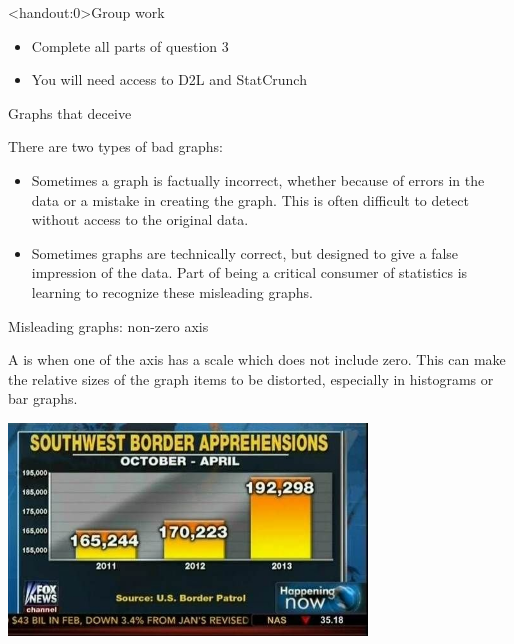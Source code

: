 \documentclass[]{beamer}
\begin{document}
\begin{frame}<handout:0>{Group work}
\begin{block}{}
\large
\begin{itemize}
\item Complete all parts of question 3
\item You will need access to D2L and StatCrunch
\end{itemize}
\end{block}
\end{frame}


\begin{frame}{Graphs that deceive}
\begin{block}{}
There are two types of bad graphs:
\begin{itemize}
\item Sometimes a graph is factually incorrect, whether because of errors in the data or a mistake in creating the graph. This is often difficult to detect without access to the original data.
\item Sometimes graphs are technically correct, but designed to give a false impression of the data. Part of being a critical consumer of statistics is learning to recognize these misleading graphs.
\end{itemize}
\end{block}
\end{frame}

\begin{frame}{Misleading graphs: non-zero axis}
\begin{block}{}
A  is when one of the axis has a scale which does not include zero. This can make the relative sizes of the graph items to be distorted, especially in histograms or bar graphs.
\end{block}
\pause
\begin{center}
\includegraphics[width=3.75in]{../images/ch02_bad_nonzero}\par
\end{center}
\end{frame}
\end{document}
